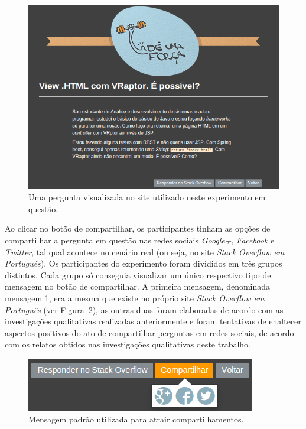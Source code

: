     \begin{figure}[H]
        \center
        \includegraphics[scale=0.7]{./figuras/printUmaForca3-3.png}
        \caption{Uma pergunta visualizada no site utilizado neste experimento em questão.}
        \label{fig:printUmaForca3-3}
    \end{figure}
    
Ao clicar no botão de compartilhar, os participantes tinham as opções de compartilhar a pergunta em questão nas redes sociais \textit{Google+}, \textit{Facebook} e \textit{Twitter}, tal qual acontece no cenário real (ou seja, no site \textit{Stack Overflow em Português}). Os participantes do experimento foram divididos em três grupos distintos. Cada grupo só conseguia visualizar um único respectivo tipo de mensagem no botão de compartilhar. A primeira mensagem, denominada mensagem 1, era a mesma que existe no próprio site \textit{Stack Overflow em Português} (ver Figura~\ref{fig:printUmaForca4}), as outras duas foram elaboradas de acordo com as investigações qualitativas realizadas anteriormente e foram tentativas de enaltecer aspectos positivos do ato de compartilhar perguntas em redes sociais, de acordo com os relatos obtidos nas investigações qualitativas deste trabalho. 

    \begin{figure}[H]
        \center
        \includegraphics[scale=0.7]{./figuras/printUmaForca4.png}
        \caption{Mensagem padrão utilizada para atrair compartilhamentos.}
        \label{fig:printUmaForca4}
    \end{figure}


